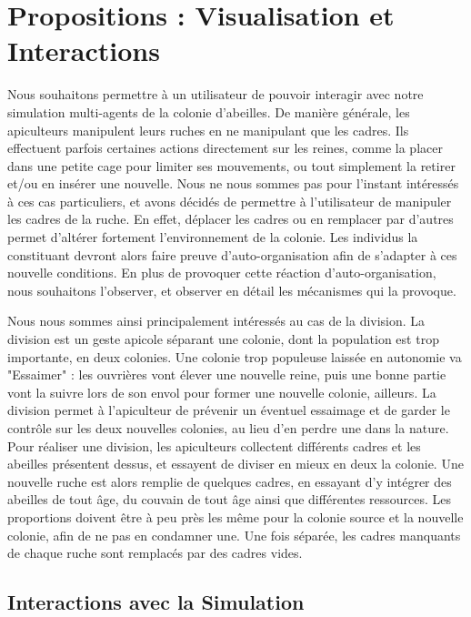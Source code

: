 \chapter{Propositions : Visualisation et Interactions}
		Nous souhaitons permettre à un utilisateur de pouvoir interagir avec notre simulation multi-agents de la colonie d'abeilles. De manière générale, les apiculteurs manipulent leurs ruches en ne manipulant que les cadres. Ils effectuent parfois certaines actions directement sur les reines, comme la placer dans une petite cage pour limiter ses mouvements, ou tout simplement la retirer et/ou en insérer une nouvelle. Nous ne nous sommes pas pour l'instant intéressés à ces cas particuliers, et avons décidés de permettre à l'utilisateur de manipuler les cadres de la ruche. En effet, déplacer les cadres ou en remplacer par d'autres permet d'altérer fortement l'environnement de la colonie. Les individus la constituant devront alors faire preuve d'auto-organisation afin de s'adapter à ces nouvelle conditions. En plus de provoquer cette réaction d'auto-organisation, nous souhaitons l'observer, et observer en détail les mécanismes qui la provoque.
		
		Nous nous sommes ainsi principalement intéressés au cas de la division. La division est un geste apicole séparant une colonie, dont la population est trop importante, en deux colonies. Une colonie trop populeuse laissée en autonomie va "Essaimer" : les ouvrières vont élever une nouvelle reine, puis une bonne partie vont la suivre lors de son envol pour former une nouvelle colonie, ailleurs. La division permet à l'apiculteur de prévenir un éventuel essaimage et de garder le contrôle sur les deux nouvelles colonies, au lieu d'en perdre une dans la nature. Pour réaliser une division, les apiculteurs collectent différents cadres et les abeilles présentent dessus, et essayent de diviser en mieux en deux la colonie. Une nouvelle ruche est alors remplie de quelques cadres, en essayant d'y intégrer des abeilles de tout âge, du couvain de tout âge ainsi que différentes ressources. Les proportions doivent être à peu près les même pour la colonie source et la nouvelle colonie, afin de ne pas en condamner une. Une fois séparée, les cadres manquants de chaque ruche sont remplacés par des cadres vides.

	\section{Interactions avec la Simulation}
		
